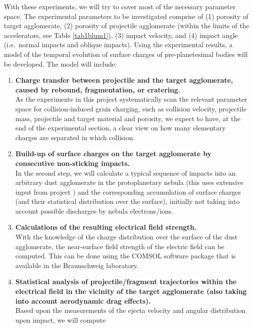 With these experiments, we will try to cover most of the necessary
parameter space. The experimental parameters to be investigated
comprise of (1) porosity of target agglomerate, (2) porosity of
projectile agglomerate (within the limits of the accelerators, see
Table \ref{tab1blum1}), (3) impact velocity, and (4) impact angle
(i.e.\ normal impacts and oblique impacts). Using the experimental
results, a model of the temporal evolution of surface charges of
pre-planetesimal bodies will be developed. The model will include:
\begin{enumerate}
    \item {\bf Charge transfer between projectile and the target
    agglomerate, caused by rebound, fragmentation, or cratering.}\\
    As the
    experiments in this project systematically scan the relevant
    parameter space for collision-induced grain charging, such as
    collision velocity, projectile mass, projectile and target
    material and porosity, we expect to have, at the end of the
    experimental section, a clear view on how many elementary
    charges are separated in which collision.
    \item {\bf Build-up of surface charges on the
    target agglomerate by consecutive non-sticking impacts.}\\
    In the
    second step, we will calculate a typical sequence of impacts
    into an arbitrary dust agglomerate in the protoplanetary
    nebula (this uses extensive input from project \projdul{}) and the
    corresponding accumulation of surface charges (and their
    statistical distribution over the surface), initially not taking into
    account possible discharges by nebula electrons/ions.
    \item {\bf Calculations of the resulting electrical field strength.}\\
    With the
    knowledge of the charge distribution over the surface of the
    dust agglomerate, the near-surface field strength of the
    electric field can be computed. This can be done using the
    COMSOL software package that is available in the Braunschweig
    laboratory.
    \item {\bf Statistical analysis of projectile/fragment
    trajectories within the electrical field in the vicinity of
    the target agglomerate (also taking into account aerodynamic
    drag effects).}\\
    Based upon the measurements of the ejecta
    velocity and angular distribution upon impact, we will compute

\end{enumerate}
